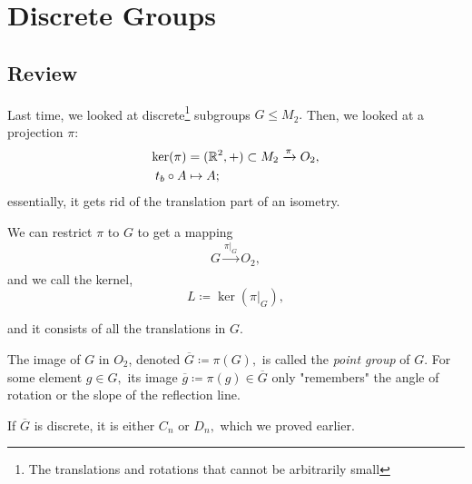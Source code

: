 
\section{Discrete Groups}
\subsection{Review}
Last time, we looked at discrete\footnote{The translations and rotations that cannot be arbitrarily small}  subgroups $G \leq M_2.$ Then, we looked at a projection $\pi$:
\begin{align*}
    \ker(\pi) &= (\mathbb R^2, +) \subset M_2 \xrightarrow[]{\pi} O_2, \\
    t_b \circ A &\mapsto A;
\end{align*}
essentially, it gets rid of the translation part of an isometry. %

We can restrict $\pi$ to $G$ to get a mapping 
\[
G \xrightarrow[]{\pi|_G} O_2,
\]
and we call the kernel, 
\[
L \coloneqq \ker(\pi|_G),
\]

and it consists of all the translations in $G.$




The image of $G$ in $O_2$, denoted $\overline{G} \coloneqq \pi(G),$ is called the \emph{point group} of $G.$ For some element $g \in G,$ its image $\overline{g} \coloneqq \pi(g) \in \overline{G}$ only "remembers" the angle of rotation or the slope of the reflection line.

If $\overline{G}$ is discrete, it is either $C_n$ or $D_n,$ which we proved earlier.


